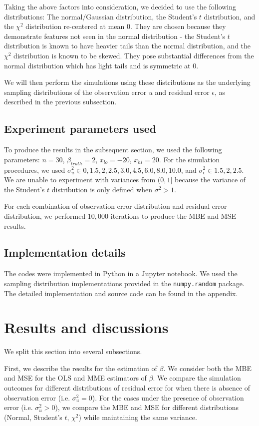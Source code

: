 \documentclass{article}
\begin{document}
Taking the above factors into consideration, we decided to use the following distributions: The normal/Gaussian distribution, the Student's $t$ distribution, and the $\chi^2$ distribution re-centered at mean $0$.
They are chosen because they demonstrate features not seen in the normal distribution - the Student's $t$ distribution is known to have heavier tails than the normal distribution, and the $\chi^2$ distribution is known to be skewed.
They pose substantial differences from the normal distribution which has light tails and is symmetric at $0$.

We will then perform the simulations using these distributions as the underlying sampling distributions of the observation error $u$ and residual error $\epsilon$, as described in the previous subsection.

\subsection{Experiment parameters used}

To produce the results in the subsequent section, we used the following parameters: $n=30$, $\beta_{truth}=2$, $x_{lo} = -20$, $x_{hi} = 20$.
For the simulation procedures, we used $\sigma^2_u \in {0, 1.5, 2, 2.5, 3.0, 4.5, 6.0, 8.0, 10.0}$, and $\sigma_\epsilon^2 \in {1.5, 2, 2.5}$.
We are unable to experiment with variances from $(0, 1]$ because the variance of the Student's $t$ distribution is only defined when $\sigma^2 > 1$.

For each combination of observation error distribution and residual error distribution, we performed $10,000$ iterations to produce the MBE and MSE results.

\subsection{Implementation details}

The codes were implemented in Python in a Jupyter notebook. We used the sampling distribution implementations provided in the \verb|numpy.random| package. The detailed implementation and source code can be found in the appendix.

\section{Results and discussions}

We split this section into several subsections.

First, we describe the results for the estimation of $\beta$.
We consider both the MBE and MSE for the OLS and MME estimators of $\beta$. 
We compare the simulation outcomes for different distributions of residual error for when there is absence of observation error (i.e. $\sigma^2_u = 0$).
For the cases under the presence of observation error (i.e. $\sigma^2_u > 0$), we compare the MBE and MSE for different distributions (Normal, Student's $t$, $\chi^2$) while maintaining the same variance.
\end{document}
